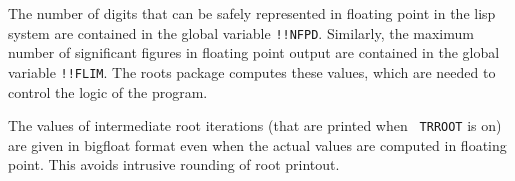The number of digits that can be safely represented in floating point in
the lisp system are contained in the global variable {\tt !!NFPD}.
Similarly, the maximum number of significant figures in floating point
output are contained in the global variable {\tt !!FLIM}.  The roots
package computes these values, which are needed to control the logic of
the program.  

The values of intermediate root iterations (that are printed when {\tt
TRROOT} is on) are given in bigfloat format even when the actual values
are computed in floating point.  This avoids intrusive rounding of root
printout.

